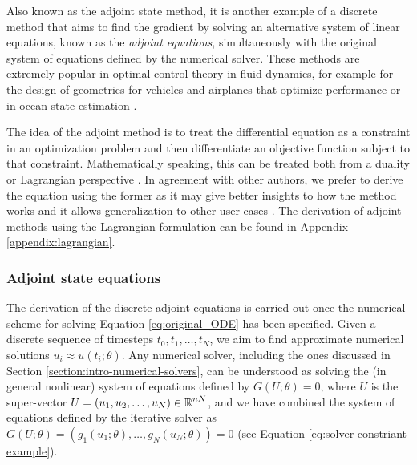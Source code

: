 Also known as the adjoint state method, it is another example of a discrete method that aims to find the gradient by solving an alternative system of linear equations, known as the \textit{adjoint equations}, simultaneously with the original system of equations defined by the numerical solver. 
These methods are extremely popular in optimal control theory in fluid dynamics, for example for the design of geometries for vehicles and airplanes that optimize performance \cite{Elliott_Peraire_1996, Giles_Pierce_2000} or in ocean state estimation \cite{Wunsch.2007,Wunsch:2008fp}.

The idea of the adjoint method is to treat the differential equation as a constraint in an optimization problem and then differentiate an objective function subject to that constraint. 
Mathematically speaking, this can be treated both from a duality or Lagrangian perspective \cite{Giles_Pierce_2000}.
In agreement with other authors, we prefer to derive the equation using the former as it may give better insights to how the method works and it allows generalization to other user cases \cite{Givoli_2021}. 
The derivation of adjoint methods using the Lagrangian formulation can be found in Appendix \ref{appendix:lagrangian}.

\subsubsection{Adjoint state equations}


The derivation of the discrete adjoint equations is carried out once the numerical scheme for solving Equation \eqref{eq:original_ODE} has been specified.  
Given a discrete sequence of timesteps $t_0, t_1, \ldots, t_N$, we aim to find approximate numerical solutions $u_i \approx u(t_i; \theta)$. 
Any numerical solver, including the ones discussed in Section \ref{section:intro-numerical-solvers}, can be understood as solving the (in general nonlinear) system of equations defined by $G(U; \theta) = 0$, where $U$ is the super-vector $U = (u_1, u_2, \ldots, u_N) \in \operatorname{\mathbb{R}}^{nN}$, and we have combined the system of equations defined by the iterative solver as $G(U; \theta) = (g_1(u_1; \theta), \ldots, g_N(u_N; \theta)) = 0$ (see Equation \eqref{eq:solver-constriant-example}).

